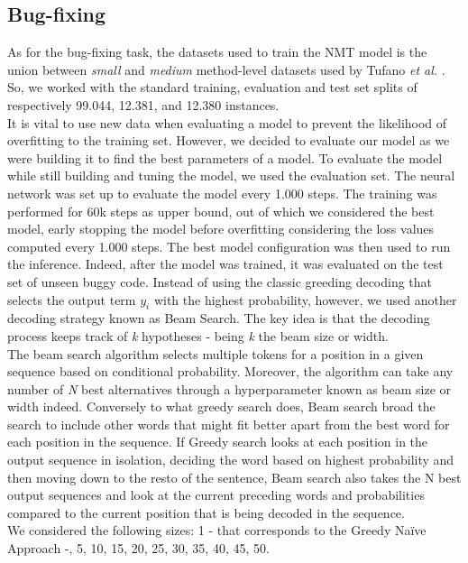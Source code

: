 \subsection{Bug-fixing}
As for the bug-fixing task, the datasets used to train the NMT model is the union between \textit{small} and \textit{medium} method-level datasets
used by Tufano \textit{et al.} \cite{Tufano2019}. So, we worked with the standard training, evaluation and test set splits of respectively
99.044, 12.381, and 12.380 instances.\\
It is vital to use new data when evaluating a model to prevent the likelihood of overfitting to the 
training set. However, we decided to evaluate our model as we were building it to find the best parameters of 
a model. To evaluate the model while still building and tuning the model, we used the evaluation set. The neural network
was set up to evaluate the model every 1.000 steps. The training was performed for 60k steps as upper bound, 
out of which we considered the best model, early stopping the model before overfitting considering the loss values computed every 1.000 steps.
The best model configuration was then used to run the inference.
Indeed, after the model was trained, it was evaluated on the test set of unseen buggy code. 
Instead of using the classic greeding decoding that selects the output term \(y_i\) with the highest probability, however, we used another decoding
strategy known as Beam Search. 
The key idea is that the decoding process keeps track of \textit{k}
hypotheses - being \textit{k} the beam size or width.\\
The beam search algorithm selects multiple tokens for a position in a given sequence based on conditional probability. Moreover, the algorithm
can take any number of \textit{N} best alternatives through a hyperparameter known as beam size or width indeed. Conversely to what greedy search does, 
Beam search broad the search to include other words that might fit better apart from the best word for each position in the sequence.
If Greedy search looks at each position in the output sequence in isolation, deciding the word based on highest probability and then moving down to the resto of the sentence,
Beam search also takes the N best output sequences and look at the current preceding words and probabilities compared to the current position that is being decoded in the sequence.\\
We considered the following sizes: 1 - that corresponds to the Greedy Naïve Approach -, 5, 10, 15, 20, 25, 30, 35, 40, 45, 50.

